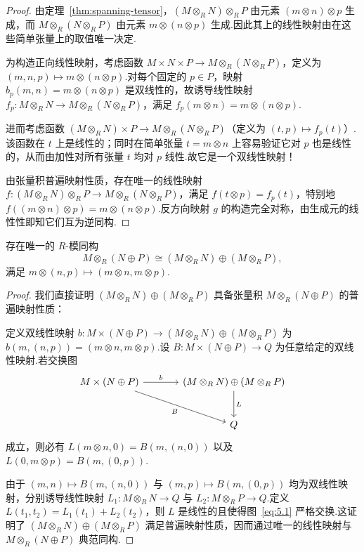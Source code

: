 \begin{proof}
由定理~\ref{thm:spanning-tensor}，$(M \otimes_R N) \otimes_R P$ 由元素 $(m \otimes n) \otimes p$ 生成，而 $M \otimes_R (N \otimes_R P)$ 由元素 $m \otimes (n \otimes p)$ 生成.因此其上的线性映射由在这些简单张量上的取值唯一决定.

为构造正向线性映射，考虑函数 $M \times N \times P \to M \otimes_R (N \otimes_R P)$，定义为 $(m, n, p) \mapsto m \otimes (n \otimes p)$.对每个固定的 $p \in P$，映射 $b_p(m, n) = m \otimes (n \otimes p)$ 是双线性的，故诱导线性映射 $f_p \colon M \otimes_R N \to M \otimes_R (N \otimes_R P)$，满足 $f_p(m \otimes n) = m \otimes (n \otimes p)$.

进而考虑函数 $(M \otimes_R N) \times P \to M \otimes_R (N \otimes_R P)$（定义为 $(t, p) \mapsto f_p(t)$）.该函数在 $t$ 上是线性的；同时在简单张量 $t = m \otimes n$ 上容易验证它对 $p$ 也是线性的，从而由加性对所有张量 $t$ 均对 $p$ 线性.故它是一个双线性映射！

由张量积普遍映射性质，存在唯一的线性映射 $f \colon (M \otimes_R N) \otimes_R P \to M \otimes_R (N \otimes_R P)$，满足 $f(t \otimes p) = f_p(t)$，特别地 $f((m \otimes n) \otimes p) = m \otimes (n \otimes p)$.反方向映射 $g$ 的构造完全对称，由生成元的线性性即知它们互为逆同构.
\end{proof}

\begin{theorem}[对有限直和的分配律]\label{thm:tensor-distrib-finite}
存在唯一的 $R$-模同构
\[
  M \otimes_R (N \oplus P) \cong (M \otimes_R N) \oplus (M \otimes_R P),
\]
满足 $m \otimes (n, p) \mapsto (m \otimes n, m \otimes p)$.
\end{theorem}

\begin{proof}
我们直接证明 $(M \otimes_R N) \oplus (M \otimes_R P)$ 具备张量积 $M \otimes_R (N \oplus P)$ 的普遍映射性质：

定义双线性映射 $b \colon M \times (N \oplus P) \to (M \otimes_R N) \oplus (M \otimes_R P)$ 为 $b(m, (n, p)) = (m \otimes n, m \otimes p)$.设 $B \colon M \times (N \oplus P) \to Q$ 为任意给定的双线性映射.若交换图
\begin{equation}
\begin{tikzcd}[row sep=large, column sep=large]
M \times (N \oplus P) \arrow[r, "b"] \arrow[dr, "B"'] & (M \otimes_R N) \oplus (M \otimes_R P) \arrow[d, "L"] \\
& Q
\end{tikzcd} \label{eq:5.1}
\end{equation}
成立，则必有 $L(m \otimes n, 0) = B(m, (n, 0))$ 以及 $L(0, m \otimes p) = B(m, (0, p))$.

由于 $(m, n) \mapsto B(m, (n, 0))$ 与 $(m, p) \mapsto B(m, (0, p))$ 均为双线性映射，分别诱导线性映射 $L_1 \colon M \otimes_R N \to Q$ 与 $L_2 \colon M \otimes_R P \to Q$.定义 $L(t_1, t_2) = L_1(t_1) + L_2(t_2)$，则 $L$ 是线性的且使得图~\eqref{eq:5.1} 严格交换.这证明了 $(M \otimes_R N) \oplus (M \otimes_R P)$ 满足普遍映射性质，因而通过唯一的线性映射与 $M \otimes_R (N \oplus P)$ 典范同构.
\end{proof}


